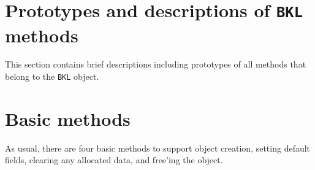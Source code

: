 \par
\section{Prototypes and descriptions of {\tt BKL} methods}
\label{section:BKL:proto}
\par
This section contains brief descriptions including prototypes
of all methods that belong to the {\tt BKL} object.
\par
\section{Basic methods}
\label{subsection:BKL:proto:basics}
\par
As usual, there are four basic methods to support object creation,
setting default fields, clearing any allocated data, and free'ing
the object.
\par
